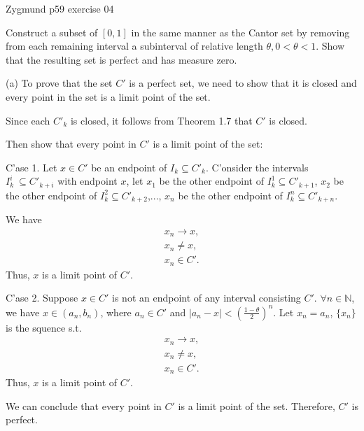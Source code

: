\documentclass[UTF8,a4paper,10pt]{article}
\begin{document}
  \pagebreak


  \begin{Problem}[]{Zygmund p59 exercise 04}

    Construct a subset of $[0, 1]$ in the same manner as the Cantor set by
    removing from each remaining interval a subinterval of relative length
    $\theta, 0 < \theta < 1$. Show that the resulting set is perfect and has measure zero.
  
  \end{Problem}


  (a) To prove that the set \(C'\) is a perfect set, we need to show that it is closed and every point in the set is a limit point of the set.

  Since each \(C'_k\) is closed, it follows from Theorem 1.7 that \(C'\) is closed. 

  Then show that every point in \(C'\) is a limit point of the set:

  C'ase 1. Let \(x\in C'\) be an endpoint of \(I_k\subseteq C'_k\). C'onsider the intervals \(I_k^i\ \subseteq C'_{k+i}\) with endpoint \(x\), let \(x_1\) be the other endpoint of \(I_k^1\subseteq C'_{k+1}\), \(x_2\) be the other endpoint of \(I_k^2\subseteq C'_{k+2}\),..., \(x_n\) be the other endpoint of \(I_k^n
  \subseteq C'_{k+n}\).

  We have 
  \begin{equation*}
    \begin{aligned}
      x_n\to x,\\
      x_n \neq x,\\
      x_n \in C'.
    \end{aligned}
  \end{equation*}
  Thus, \(x\) is a limit point of \(C'\).

  C'ase 2. Suppose \(x\in C'\) is not an endpoint of any interval consisting \(C'\). \(\forall n\in\mathbb{N}\), we have \(x\in (a_n, b_n)\), where \(a_n\in C'\) and \(|a_n-x|<(\frac{1-\theta}{2})^{n}\). Let \(x_n = a_n\), \(\{x_n\}\) is the squence s.t. 
  \begin{equation*}
    \begin{aligned}
      x_n\to x,\\
      x_n \neq x,\\
      x_n \in C'.
    \end{aligned}
  \end{equation*}
  Thus, \(x\) is a limit point of \(C'\).

  We can conclude that every point in \(C'\) is a limit point of the set. Therefore, \(C'\) is perfect.
\end{document}
